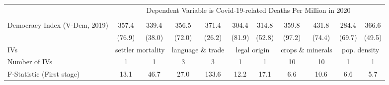 {\begin{tabular}{l*{10}{c}}
& \multicolumn{10}{c}{Dependent Variable is Covid-19-related Deaths Per Million in 2020} \\\cline{2-11}\\[-1.8ex]
Democracy Index (V-Dem, 2019)&       357.4\sym{***}&       339.4\sym{***}&       356.5\sym{***}&       371.4\sym{***}&       304.4\sym{***}&       314.8\sym{***}&       359.8\sym{***}&       431.8\sym{***}&       284.4\sym{***}&       366.6\sym{***}\\
&      (76.9)         &      (38.0)         &      (72.0)         &      (26.2)         &      (81.9)         &      (52.8)         &      (97.2)         &      (74.4)         &      (69.7)         &      (49.5)         \\
IVs & \multicolumn{2}{c}{settler mortality} & \multicolumn{2}{c}{language \& trade} & \multicolumn{2}{c}{legal origin} &  \multicolumn{2}{c}{crops \& minerals} &  \multicolumn{2}{c}{pop. density} \\
Number of IVs & 1 & 1 & 3 & 3 & 1 & 1 & 10 & 10 & 1 & 1 \\
F-Statistic (First stage)&        13.1         &        46.7         &        27.0         &       133.6         &        12.2         &        17.1         &         6.6         &        10.6         &         6.6         &         5.7         \\
\hline\hline
\end{tabular}
}
